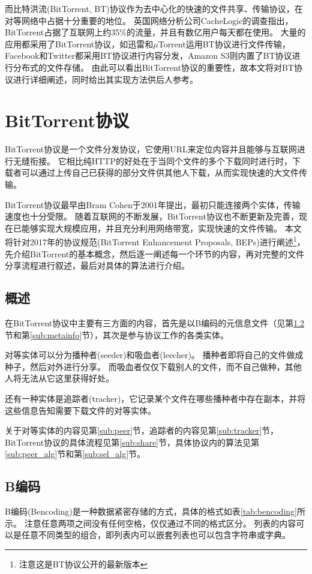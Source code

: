 \documentclass[thesis]{thesis}
\begin{document}
	而比特洪流(BitTorrent, BT)协议\cite{wiki_bt}作为去中心化的快速的文件共享、传输协议，在对等网络中占据十分重要的地位。
	英国网络分析公司CacheLogic的调查指出，BitTorrent占据了互联网上约35\%的流量，并且有数亿用户每天都在使用\cite{internet_traffic}。
	大量的应用都采用了BitTorrent协议，如迅雷\cite{xunlei}和$\mu$Torrent\cite{utorrent}运用BT协议进行文件传输，Facebook\cite{facebook}和Twitter\cite{twitter}都采用BT协议进行内容分发，Amazon S3则内置了BT协议进行分布式的文件存储。
	由此可以看出BitTorrent协议的重要性，故本文将对BT协议进行详细阐述，同时给出其实现方法供后人参考。
	
	\section{BitTorrent协议}
	BitTorrent协议是一个文件分发协议，它使用URL来定位内容并且能够与互联网进行无缝衔接。
	它相比纯HTTP的好处在于当同个文件的多个下载同时进行时，下载者可以通过上传自己已获得的部分文件供其他人下载，从而实现快速的大文件传输。
	
	BitTorrent协议最早由Bram Cohen于2001年提出，最初只能连接两个实体，传输速度也十分受限\cite{bt_ppt}。
	随着互联网的不断发展，BitTorrent协议也不断更新及完善，现在已能够实现大规模应用，并且充分利用网络带宽，实现快速的文件传输。
	本文将针对2017年的协议规范(BitTorrent Enhancement Proposals, BEPs)\cite{bt_org}进行阐述\footnote{注意这是BT协议公开的最新版本}，先介绍BitTorrent的基本概念，然后逐一阐述每一个环节的内容，再对完整的文件分享流程进行叙述，最后对具体的算法进行介绍。
	
	\subsection{概述}
	在BitTorrent协议中主要有三方面的内容，首先是以B编码的元信息文件（见第\ref{sub:bencoding}节和第\ref{sub:metainfo}节），其次是参与协议工作的各类实体。
	
	对等实体可以分为播种者(seeder)和吸血者(leecher)。
	播种者即将自己的文件做成种子，然后对外进行分享。
	而吸血者仅仅下载别人的文件，而不自己做种，其他人将无法从它这里获得好处。
	
	还有一种实体是追踪者(tracker)，它记录某个文件在哪些播种者中存在副本，并将这些信息告知需要下载文件的对等实体。
	
	关于对等实体的内容见第\ref{sub:peer}节，追踪者的内容见第\ref{sub:tracker}节，BitTorrent协议的具体流程见第\ref{sub:share}节，具体协议内的算法见第\ref{sub:peer_alg}节和第\ref{sub:sel_alg}节。
	
	\subsection{B编码}
	\label{sub:bencoding}
	B编码(Bencoding)是一种数据紧密存储的方式，具体的格式如表\ref{tab:bencoding}所示。
	注意任意两项之间没有任何空格，仅仅通过不同的格式区分。
	列表的内容可以是任意不同类型的组合，即列表内可以嵌套列表也可以包含字符串或字典。
	
\end{document}
